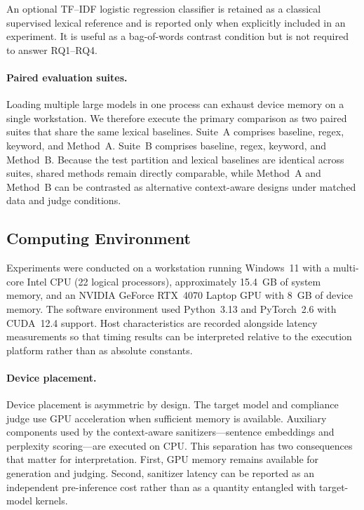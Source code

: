 ﻿\documentclass[10pt]{article}
\begin{document}
An optional TF--IDF logistic regression classifier is retained as a classical supervised lexical reference and is reported only when explicitly included in an experiment.
It is useful as a bag-of-words contrast condition but is not required to answer RQ1--RQ4.

\paragraph{Paired evaluation suites.}
Loading multiple large models in one process can exhaust device memory on a single workstation.
We therefore execute the primary comparison as two paired suites that share the same lexical baselines.
Suite~A comprises baseline, regex, keyword, and Method~A.
Suite~B comprises baseline, regex, keyword, and Method~B.
Because the test partition and lexical baselines are identical across suites, shared methods remain directly comparable, while Method~A and Method~B can be contrasted as alternative context-aware designs under matched data and judge conditions.

\subsection{Computing Environment}
\label{sec:hardware}

Experiments were conducted on a workstation running Windows~11 with a multi-core Intel CPU (22 logical processors), approximately 15.4~GB of system memory, and an NVIDIA GeForce RTX~4070 Laptop GPU with 8~GB of device memory.
The software environment used Python~3.13 and PyTorch~2.6 with CUDA~12.4 support.
Host characteristics are recorded alongside latency measurements so that timing results can be interpreted relative to the execution platform rather than as absolute constants.

\paragraph{Device placement.}
Device placement is asymmetric by design.
The target model and compliance judge use GPU acceleration when sufficient memory is available.
Auxiliary components used by the context-aware sanitizers---sentence embeddings and perplexity scoring---are executed on CPU.
This separation has two consequences that matter for interpretation.
First, GPU memory remains available for generation and judging.
Second, sanitizer latency can be reported as an independent pre-inference cost rather than as a quantity entangled with target-model kernels.
\end{document}
